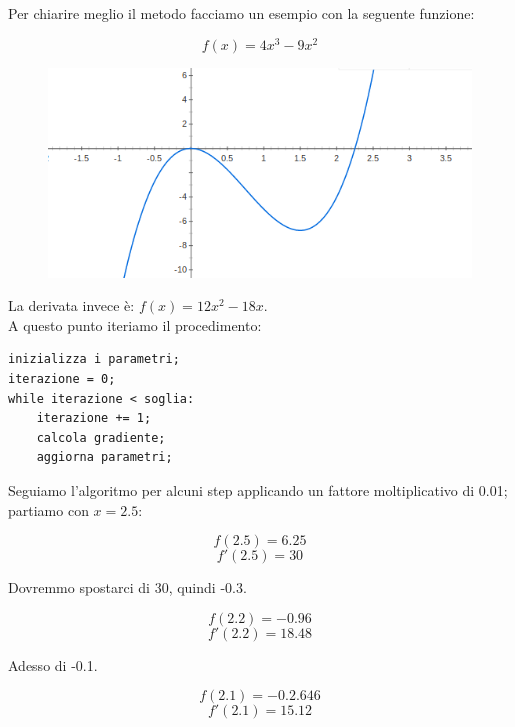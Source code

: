 \documentclass[12pt]{article}
\begin{document}
Per chiarire meglio il metodo facciamo un esempio con la seguente funzione:

\begin{equation}f(x)=4x^3-9x^2\end{equation}
\begin{figure}[H]{}
    \centering
    \includegraphics[scale=0.5]{../images/e.png}
    \label{fig:cc}
\end{figure}

La derivata invece è: $f(x)=12x^2-18x$.\\
A questo punto iteriamo il procedimento:\\


\begin{lstlisting}
inizializza i parametri;
iterazione = 0;
while iterazione < soglia:
    iterazione += 1;
    calcola gradiente;
    aggiorna parametri;
\end{lstlisting}


Seguiamo l'algoritmo per alcuni step applicando un fattore
moltiplicativo di 0.01; partiamo con $x=2.5$:

\begin{equation}f(2.5)=6.25\end{equation}
\begin{equation}f'(2.5)=30\end{equation}

Dovremmo spostarci di 30, quindi -0.3.

\begin{equation}f(2.2)=-0.96\end{equation}
\begin{equation}f'(2.2)=18.48\end{equation}

Adesso di -0.1.

\begin{equation}f(2.1)=-0.2.646\end{equation}
\begin{equation}f'(2.1)=15.12\end{equation}
\end{document}
